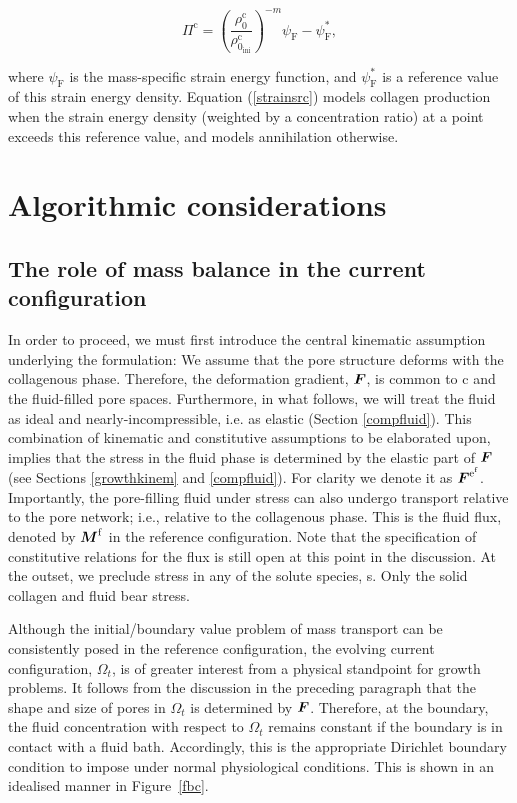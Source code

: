 \begin{equation}
\Pi^\mathrm{c} =
\left(\frac{\rho^\mathrm{c}_0}{\rho^\mathrm{c}_{0_\mathrm{ini}}}\right)^{-m}
\psi_{\mathrm{F}}-\psi_{\mathrm{F}}^*,
\label{strainsrc}
\end{equation}

\noindent where $\psi_{\mathrm{F}}$ is the mass-specific strain energy
function, and $\psi_{\mathrm{F}}^*$ is a reference value of this
strain energy density. Equation (\ref{strainsrc}) models collagen
production when the strain energy density (weighted by a concentration
ratio) at a point exceeds this reference value, and models 
annihilation otherwise.

\section{Algorithmic considerations}
\label{algorithmic-considerations}


\subsection{The role of mass balance in the current
  configuration}
\label{role-of-current-mass-balance} 

In order to proceed, we must first introduce the central kinematic
assumption underlying the 
formulation: We assume that the pore structure deforms with the
collagenous phase. Therefore, the deformation gradient, $\mbox{\boldmath$ F$}$, is
common to c and the fluid-filled pore spaces. Furthermore, in what
follows, we will treat the fluid as ideal and nearly-incompressible,
i.e. as elastic (Section \ref{compfluid}). This combination of
kinematic and constitutive assumptions to be elaborated upon, implies
that the stress in the fluid phase is determined by the elastic part of
$\mbox{\boldmath$ F$}$ (see Sections \ref{growthkinem} and
\ref{compfluid}). For clarity we denote it as
$\mbox{\boldmath$ F$}^{\mathrm{e}^\mathrm{f}}$. Importantly, the pore-filling fluid under stress
can also undergo transport relative to the pore network; i.e.,
relative to the collagenous phase. This is the fluid flux, denoted by
$\mbox{\boldmath$ M$}^\mathrm{f}$ in the reference configuration. Note that the
specification of constitutive relations for the flux is still open at
this point in the discussion. At the outset, we preclude stress in any
of the solute species, s. Only the solid collagen and fluid bear
stress. 

Although the initial/boundary value problem of mass transport can be
consistently posed in the reference configuration, the evolving
current configuration, $\Omega_t$, is of greater interest from a
physical standpoint for growth problems. It follows from the
discussion in the preceding paragraph that the shape and size of
pores in $\Omega_t$ is determined by $\mbox{\boldmath$ F$}$. Therefore, at
the boundary, the fluid concentration with 
respect to $\Omega_t$ remains constant if the boundary is in contact
with a fluid bath.  Accordingly, this is the appropriate Dirichlet
boundary condition to impose under normal physiological
conditions. This is shown in an idealised manner in Figure~\ref{fbc}.

